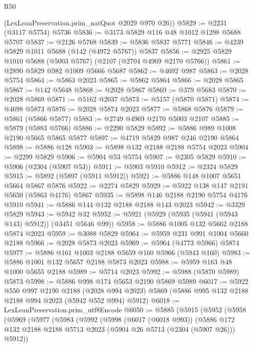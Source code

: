 \begin{lexlean}{R50}
\begin{coremodule}
      (LexLeanPreservation.prim_natQuot @2029 @970 @26))
@5829 := @2231 (@3117 @5754) @5736
@5836 := @3173 @5829 @116 @48 @1012 @1298 @5688 @5707
@5837 := @2126 @5768
@5839 := @5836 @5837 @5771
@5846 := @4239 @5829 @1011 @5688 (@142 (@4972 @5767)) @5837
@5856 := @2925 @5829 @1010 @5688 (@5003 @5767) (@2107 (@2704 @4969 @2170 @5766))
@5861 := @2890 @5829 @982 @1009 @5666 @5687
@5862 := @4692 @987
@5863 := @2028 @5754
@5864 := @5863 @2023
@5865 := @5862 @5864
@5866 := @2028 @5865
@5867 := @142 @5648
@5868 := @2028 @5867
@5869 := @379 @5683
@5870 := @2028 @5869
@5871 := @5162 @2037
@5873 := @5157 (@5870 @5871)
@5874 := @4698 @5873
@5876 := @2028 @5874 @2023
@5877 := @5868 @5876
@5879 := @5861 (@5866 @5877)
@5883 := @2749 @4969 @2170 @5003 @2107
@5885 := @5879 (@5883 @5766)
@5886 := @2290 @5829
@5892 := @5886 @989 @1008 @2190 @5665 @5865 @5877
@5897 := @4719 @5829 @987 @246 @2190 @5864
@5898 := @5886 @128
@5903 := @5898 @132 @2188 @2188 @5754 @2023
@5904 := @2299 @5829
@5906 := @5904 @53 @5754
@5907 := @2305 @5829
@5910 := @5906 (@2304 (@5907 @53))
@5911 := @5903 @5910
@5912 := @2324 @5829
@5915 := @5892 (@5897 (@5911 @5912))
@5921 := @5886 @148 @1007 @5651 @5664 @5867 @5876
@5922 := @2274 @5829
@5929 := @5922 @138 @147 @2191 @5650 (@5863 @4176) @5867
@5935 := @5898 @146 @2188 @2190 @5754 @4176 @5910
@5941 := @5886 @144 @132 @2188 @2188 @143 @2023
@5942 := @3329 @5829
@5943 := @5942 @32
@5952 := @5921 (@5929 (@5935 (@5941 (@5943 @143) @5912)) (@3451 @5646 @99))
@5958 := @5886 @1005 @132 @5662 @2188 @5874 @2023
@5959 := @3088 @5829
@5964 := @5959 @231 @991 @1004 @5660 @2188
@5966 := @2028 @5873 @2023
@5969 := @5964 (@4773 @5966) @5874
@5977 := @5886 @161 @1003 @2188 @5659 @160 @5966 (@5943 @160)
@5983 := @5886 @1001 @132 @5657 @2188 @5873 @2023
@5988 := @5959 @163 @48 @1000 @5655 @2188
@5989 := @5714 @2023
@5992 := @5988 (@5870 @5989) @5873
@5998 := @5886 @998 @174 @5653 @2190 @5869 @5989
@6017 := @5922
    @550
    @997
    @2190
    @2188
    (@2028 @994 @2023)
    @5869
    (@5886 @995 @132 @2188 @2188 @994 @2023 (@5942 @552 @994) @5912)
@6018 := LexLeanPreservation.prim_utf8Encode
@6050 := @5885
    (@5915
      (@5952
        (@5958
          (@5969
            (@5977
              (@5983
                (@5992
                  (@5998
                    (@6017 (@6018 @993))
                    (@5886
                      @172
                      @132
                      @2188
                      @2188
                      @5713
                      @2023
                      (@5904 @26 @5713 (@2304 (@5907 @26)))
                      @5912))

\end{coremodule}
\end{lexlean}

